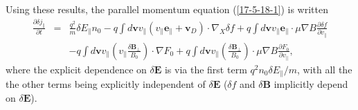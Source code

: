 \documentclass{article}
\begin{document}
Using these results, the parallel momentum equation (\ref{17-5-18-1}) is
written
\begin{eqnarray}
  \frac{\partial \delta j_{\parallel}}{\partial t} & = & \frac{q^2}{m} \delta
  E_{\parallel} n_0 - q \int d\mathbf{v}v_{\parallel} (v_{\parallel}
  \mathbf{e}_{\parallel} +\mathbf{v}_D) \cdot \nabla_X \delta f + q \int
  d\mathbf{v}v_{\parallel} \mathbf{e}_{\parallel} \cdot \mu \nabla B
  \frac{\partial \delta f}{\partial v_{\parallel}} \nonumber\\
  &  & - q \int d\mathbf{v}v_{\parallel} \left( v_{\parallel} \frac{\delta
  \mathbf{B}_{\perp}}{B_0} \right) \cdot \nabla F_0 + q \int
  d\mathbf{v}v_{\parallel} \left( \frac{\delta \mathbf{B}_{\perp}}{B_0}
  \right) \cdot \mu \nabla B \frac{\partial F_0}{\partial v_{\parallel}}, 
  \label{17-5-18-p3}
\end{eqnarray}
where the explicit dependence on $\delta \mathbf{E}$ is via the first term
$q^2 n_0 \delta E_{\parallel} / m$, with all the the other terms being
explicitly independent of $\delta \mathbf{E}$ ($\delta f$ and $\delta
\mathbf{B}$ implicitly depend on $\delta \mathbf{E}$).
\end{document}
